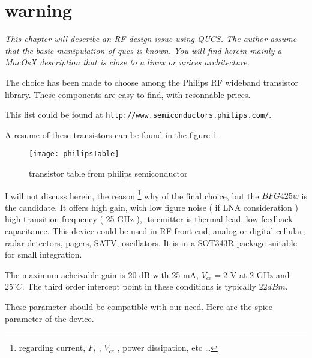 %
%
%
%

\section*{warning}

\textit{
This chapter will describe an RF design issue using QUCS. The author assume that the basic manipulation of qucs is known. You will find herein mainly a MacOsX description that is close to a linux or unices architecture.
}



The choice has been made to choose among the Philips RF wideband transistor library. These components are easy to find, with resonnable prices.

This list could be found at \texttt{http://www.semiconductors.philips.com/}.

A resume of these transistors can be found in the figure \ref{design:pa:toTable}
\begin{figure}[htbp]
\begin{center}
\texttt{[image: philipsTable]}
\caption{transistor table from philips semiconductor}
\label{design:pa:toTable}
\end{center}
\end{figure}

I will not discuss herein, the reason \footnote{regarding current, $F_t$ , $V_{ce}$ , power dissipation, etc \ldots} why of the final choice, but the $BFG425w$ is the candidate. It offers high gain, with low figure noise ( if LNA consideration )  high transition frequency ( 25 GHz ), its emitter is thermal lead, low feedback capacitance. This device could be used in RF front end, analog or digital cellular, radar detectors, pagers, SATV, oscillators. It is in a SOT343R package suitable for small integration.

The maximum acheivable gain is 20 dB with 25 mA, $V_{ce} = 2$ V at 2 GHz and $25^\circ C$. The third order intercept point in these conditions is typically $22 dBm$.

These parameter should be compatible with our need. Here are the spice parameter of the device.

